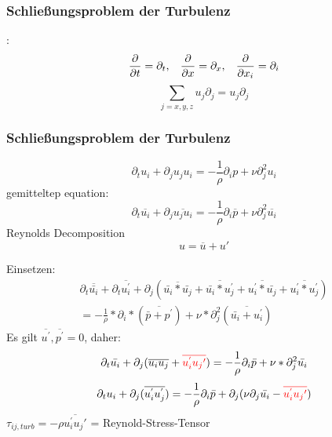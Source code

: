 \documentclass[11pt,t]{beamer}
\newcommand*\mean[1]{\overline{#1}}
\begin{document}
\begin{frame}
	\frametitle{Schließungsproblem der Turbulenz}
			:
\begin{equation}
\frac{\partial}{\partial t} = \partial_t, \hspace{0.3 cm}\frac{\partial}{\partial x} = \partial_x,\hspace{0.3 cm} \frac{\partial}{\partial x_i} = \partial_i
\end{equation}
\begin{equation}
\sum_{j=x,y,z}u_j\partial_j = u_j\partial_j
\end{equation}
\end{frame}


\begin{frame}
\frametitle{Schließungsproblem der Turbulenz}
\begin{equation}
\partial_t u_i + \partial_j u_ju_i = -\frac{1}{\rho}\partial_i p + \nu\partial^2_j u_i
\end{equation}
gemitteltep equation:
\begin{equation}
\partial_t \overline{u_i} + \partial_j \overline{u_ju_i} = -\frac{1}{\rho}\partial_i \overline{p} + \nu\partial^2_j \overline{u_i}
\end{equation}
Reynolds Decomposition
\begin{equation}
u = \overline{u} + u'
\end{equation}
\end{frame}

\begin{frame}
Einsetzen:
\begin{align}
\partial_t \overline{\bar{u_i}} + \partial_t \overline{u_i^{'}}+ \partial_j (\overline{\bar{u_i}*\bar{u_j}} + \overline{\bar{u_i}*u_j^{'}} + \overline{u_i^{'}*\bar{u_j}} + \overline{u_i^{'}*u_j^{'}}) \\
= - \frac{1}{\rho}*\partial_i*(\overline{\bar{p}+p^{'}}) + \nu*\partial_j^2  (\overline{\bar{u_i}+u_i^{'}})
\end{align}
Es gilt $\overline{u^{'}},\overline{p^{'}} = 0$, daher:
\begin{align}
\partial_t \bar{u_i} + \partial_j (\overline{u_iu_j}+{\color{red}\overline{u_i^{'}u_j{'}}}) = - \frac{1}{\rho} \partial_i \bar{p}+\nu*\partial_j^2\bar{u_i}
\end{align}
\begin{align}
\partial_tu_i+\partial_j(\mean{u_i^{'}u_j^{'}}) = - \frac{1}{\rho} \partial_i \bar{p}+\partial_j(\nu\partial_j\bar{u_i}-{\color{red}\overline{u_i^{'}u_j{'}}})
\end{align}
$\tau_{ij,turb} = -\rho\overline{u_i^{'}u_j{'}}$ = Reynold-Stress-Tensor
\end{frame}
\end{document}
